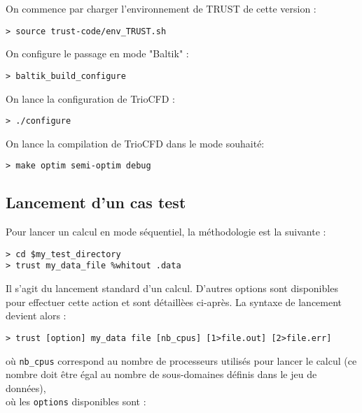 On commence par charger l'environnement de TRUST de cette version :
\begin{lstlisting}
> source trust-code/env_TRUST.sh
\end{lstlisting}
On configure le passage en mode "Baltik" :
\begin{lstlisting}
> baltik_build_configure
\end{lstlisting}
On lance la configuration de TrioCFD :
\begin{lstlisting}
> ./configure
\end{lstlisting}
On lance la compilation de TrioCFD dans le mode souhaité:
\begin{lstlisting}
> make optim semi-optim debug
\end{lstlisting}

\subsection{Lancement d'un cas test}
Pour lancer un calcul en mode séquentiel, la méthodologie est la suivante :

\begin{lstlisting}
> cd $my_test_directory
> trust my_data_file %whitout .data
\end{lstlisting}

Il s'agit du lancement standard d'un calcul. D'autres options sont disponibles pour effectuer
cette action et sont d\'etaill\`ees ci-apr\`es.
La syntaxe de lancement devient alors :
\begin{lstlisting}
> trust [option] my_data file [nb_cpus] [1>file.out] [2>file.err]
\end{lstlisting}
où \texttt{nb\_cpus} correspond au nombre de processeurs utilisés pour lancer le calcul (ce nombre doit être égal au nombre de sous-domaines définis dans le jeu de données),\\
où les \texttt{options} disponibles sont :

